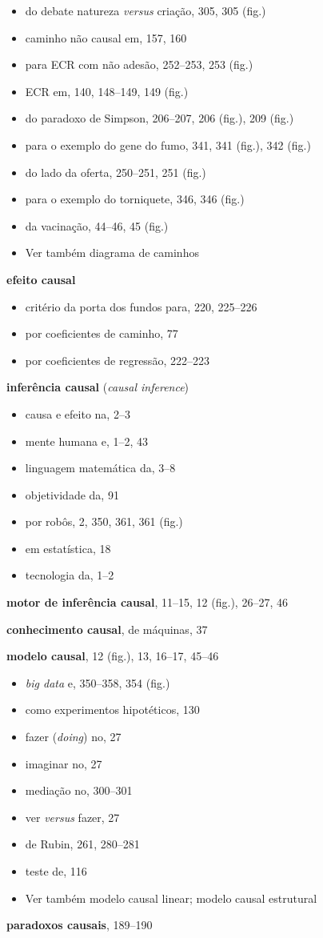 \documentclass[11pt,a5paper,twoside]{book}
\begin{document}
\begin{itemize}
\item do debate natureza \textit{versus} criação, 305, 305 (fig.)
\item caminho não causal em, 157, 160
\item para ECR com não adesão, 252–253, 253 (fig.)
\item ECR em, 140, 148–149, 149 (fig.)
\item do paradoxo de Simpson, 206–207, 206 (fig.), 209 (fig.)
\item para o exemplo do gene do fumo, 341, 341 (fig.), 342 (fig.)
\item do lado da oferta, 250–251, 251 (fig.)
\item para o exemplo do torniquete, 346, 346 (fig.)
\item da vacinação, 44–46, 45 (fig.)
\item Ver também diagrama de caminhos
\end{itemize}
\textbf{efeito causal}

\begin{itemize}
\item critério da porta dos fundos para, 220, 225–226
\item por coeficientes de caminho, 77
\item por coeficientes de regressão, 222–223
\end{itemize}
\textbf{inferência causal} (\textit{causal inference})

\begin{itemize}
\item causa e efeito na, 2–3
\item mente humana e, 1–2, 43
\item linguagem matemática da, 3–8
\item objetividade da, 91
\item por robôs, 2, 350, 361, 361 (fig.)
\item em estatística, 18
\item tecnologia da, 1–2
\end{itemize}
\textbf{motor de inferência causal}, 11–15, 12 (fig.), 26–27, 46

\textbf{conhecimento causal}, de máquinas, 37

\textbf{modelo causal}, 12 (fig.), 13, 16–17, 45–46

\begin{itemize}
\item \textit{big data} e, 350–358, 354 (fig.)
\item como experimentos hipotéticos, 130
\item fazer (\textit{doing}) no, 27
\item imaginar no, 27
\item mediação no, 300–301
\item ver \textit{versus} fazer, 27
\item de Rubin, 261, 280–281
\item teste de, 116
\item Ver também modelo causal linear; modelo causal estrutural
\end{itemize}
\textbf{paradoxos causais}, 189–190
\end{document}
